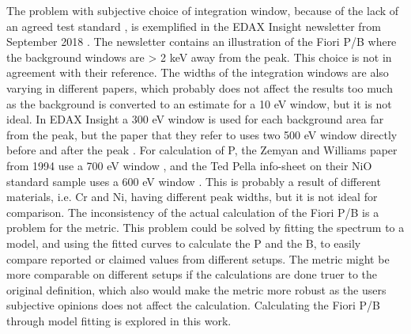The problem with subjective choice of integration window, because of the lack of an agreed test standard \cite{williams_standard_definitions_1986}, is exemplified in the EDAX Insight newsletter from September 2018 \cite{edax_insight_2018}.
The newsletter contains an illustration of the Fiori P/B where the background windows are > 2 keV away from the peak.
This choice is not in agreement with their reference.
The widths of the integration windows are also varying in different papers, which probably does not affect the results too much as the background is converted to an estimate for a 10 eV window, but it is not ideal.
In EDAX Insight a 300 eV window is used for each background area far from the peak, but the paper that they refer to uses two 500 eV window directly before and after the peak \cite{egerton_nio_characterization_1994}.
For calculation of P, the Zemyan and Williams paper from 1994 use a 700 eV window \cite{zemyan_standard_performance_1994}, and the Ted Pella info-sheet on their NiO standard sample uses a 600 eV window \cite{ted_pella_nio_tem_2019}.
This is probably a result of different materials, i.e. Cr and Ni, having different peak widths, but it is not ideal for comparison.
The inconsistency of the actual calculation of the Fiori P/B is a problem for the metric.
This problem could be solved by fitting the spectrum to a model, and using the fitted curves to calculate the P and the B, to easily compare reported or claimed values from different setups.
The metric might be more comparable on different setups if the calculations are done truer to the original definition, which also would make the metric more robust as the users subjective opinions does not affect the calculation.
Calculating the Fiori P/B through model fitting is explored in this work.





